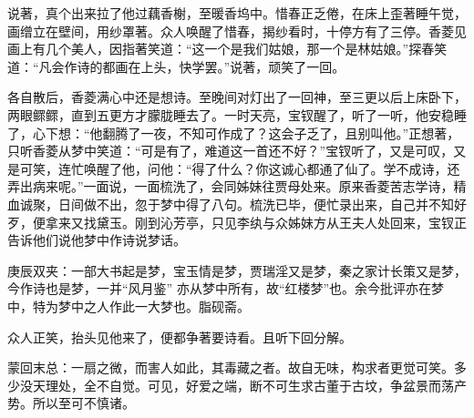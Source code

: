 \begin{parag}
    说著，真个出来拉了他过藕香榭，至暖香坞中。惜春正乏倦，在床上歪著睡午觉，画缯立在壁间，用纱罩著。众人唤醒了惜春，揭纱看时，十停方有了三停。香菱见画上有几个美人，因指著笑道：“这一个是我们姑娘，那一个是林姑娘。”探春笑道：“凡会作诗的都画在上头，快学罢。”说著，顽笑了一回。
\end{parag}


\begin{parag}
    各自散后，香菱满心中还是想诗。至晚间对灯出了一回神，至三更以后上床卧下，两眼鳏鳏，直到五更方才朦胧睡去了。一时天亮，宝钗醒了，听了一听，他安稳睡了，心下想：“他翻腾了一夜，不知可作成了？这会子乏了，且别叫他。”正想著，只听香菱从梦中笑道：“可是有了，难道这一首还不好？”宝钗听了，又是可叹，又是可笑，连忙唤醒了他，问他：“得了什么？你这诚心都通了仙了。学不成诗，还弄出病来呢。”一面说，一面梳洗了，会同姊妹往贾母处来。原来香菱苦志学诗，精血诚聚，日间做不出，忽于梦中得了八句。梳洗已毕，便忙录出来，自己并不知好歹，便拿来又找黛玉。刚到沁芳亭，只见李纨与众姊妹方从王夫人处回来，宝钗正告诉他们说他梦中作诗说梦话。\begin{note}庚辰双夹：一部大书起是梦，宝玉情是梦，贾瑞淫又是梦，秦之家计长策又是梦，今作诗也是梦，一并“风月鉴” 亦从梦中所有，故“红楼梦”也。余今批评亦在梦中，特为梦中之人作此一大梦也。脂砚斋。\end{note}众人正笑，抬头见他来了，便都争著要诗看。且听下回分解。
\end{parag}


\begin{parag}
    \begin{note}蒙回末总：一扇之微，而害人如此，其毒藏之者。故自无味，构求者更觉可笑。多少没天理处，全不自觉。可见，好爱之端，断不可生求古董于古坟，争盆景而荡产势。所以至可不慎诸。\end{note}
\end{parag}

